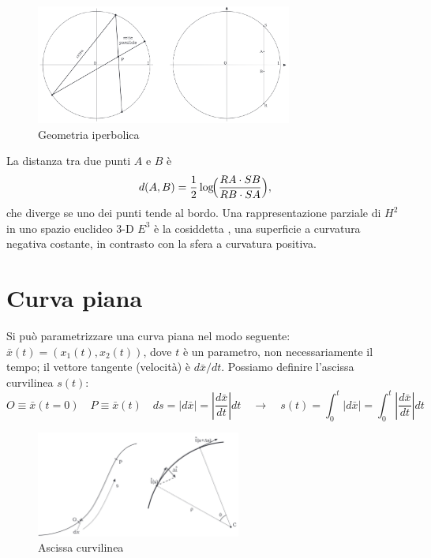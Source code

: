 \begin{figure}[H]
    \centering
    \includegraphics[width=0.75\textwidth]{assets/hyperbolic_geometry.png}
    \caption{Geometria iperbolica}
\end{figure}

\vspace{-1em}

La distanza tra due punti $A$ e $B$ è
$$
d(A,B) = \frac12 \log \!\Bigl(\frac{RA\cdot SB}{RB\cdot SA}\Bigr),
$$
che diverge se uno dei punti tende al bordo. Una rappresentazione parziale di $H^2$ in uno spazio euclideo 3-D $E^3$ è la cosiddetta , una superficie a curvatura negativa costante, in contrasto con la sfera a curvatura positiva.

\section{Curva piana}

Si può parametrizzare una curva piana nel modo seguente: $\bar x(t) = (x_1(t), x_2(t))$, dove $t$ è un parametro, non necessariamente il tempo; il vettore tangente (velocità) è ${d\bar x}/{dt}$. Possiamo definire l'ascissa curvilinea $s(t)$:
$$
O \equiv \bar x(t = 0) \quad P \equiv \bar x(t) \quad ds = |d\bar x| = |\dfrac {d\bar x}{dt}| dt \quad \to \quad s(t) = \int_0^t |d\bar x| = \int_0^t |\dfrac {d\bar x}{dt}| dt
$$

\vspace{-1em}

\begin{figure}[H]
    \centering
    \includegraphics[width=0.6\textwidth]{assets/curve.png}
    \caption{Ascissa curvilinea}
\end{figure}

